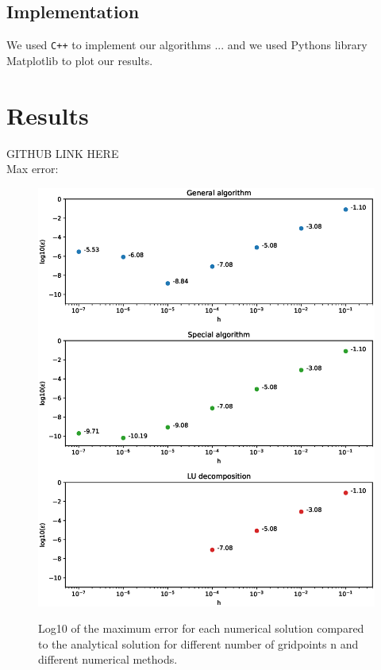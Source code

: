\documentclass[american,a4paper,12pt]{article}
\begin{document}
\subsection{Implementation}
We used \verb!C++! to implement our algorithms ... and we used Pythons library Matplotlib to plot our results.

\section{Results}
  GITHUB LINK HERE \\
  Max error:
  \begin{figure}[H]
  \begin{center}
    \includegraphics[width = \textwidth]{figures/max_err.eps} \\
    \caption{Log10 of the maximum error for each numerical solution compared to the analytical solution for different number of gridpoints n and different numerical methods.}
    \label{fig:max_err}
    \end{center}
  \end{figure}
\end{document}
